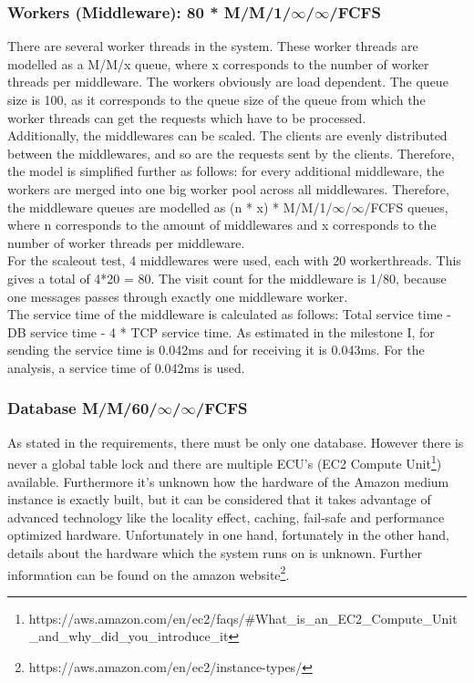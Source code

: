 \documentclass[a4paper]{article}
\begin{document}
\subsubsection{Workers (Middleware): 80 * M/M/1/$\infty$/$\infty$/FCFS}

There are several worker threads in the system. These worker threads are modelled as a M/M/x queue, where x corresponds to the number of worker threads per middleware. The workers obviously are load dependent. The queue size is 100, as it corresponds to the queue size of the queue from which the worker threads can get the requests which have to be processed.\\

\noindent Additionally, the middlewares can be scaled. The clients are evenly distributed between the middlewares, and so are the requests sent by the clients. Therefore, the model is simplified further as follows: for every additional middleware, the workers are merged into one big worker pool across all middlewares. Therefore, the middleware queues are modelled as (n * x) * M/M/1/$\infty$/$\infty$/FCFS queues, where n corresponds to the amount of middlewares and x corresponds to the number of worker threads per middleware.\\

For the scaleout test, 4 middlewares were used, each with 20 workerthreads. This gives a total of 4*20 = 80. The visit count for the middleware is 1/80, because one messages passes through exactly one middleware worker.\\

The service time of the middleware is calculated as follows:
Total service time - DB service time - 4 * TCP service time. As estimated in the milestone I, for sending the service time is 0.042ms and for receiving it is 0.043ms. For the analysis, a service time of 0.042ms is used.\\


\subsubsection{Database M/M/60/$\infty$/$\infty$/FCFS}

As stated in the requirements, there must be only one database. However there is never a global table lock and there are multiple ECU's (EC2 Compute Unit\footnote{https://aws.amazon.com/en/ec2/faqs/\#What\_is\_an\_EC2\_Compute\_Unit\_and\_why\_did\_you\_introduce\_it})  available. Furthermore it's unknown how the hardware of the Amazon medium instance is exactly built, but it can be considered that it takes advantage of advanced technology like the locality effect, caching, fail-safe and performance optimized hardware. Unfortunately in one hand, fortunately in the other hand, details about the hardware which the system runs on is unknown. Further information can be found on the amazon website\footnote{https://aws.amazon.com/en/ec2/instance-types/}.\\
\end{document}
